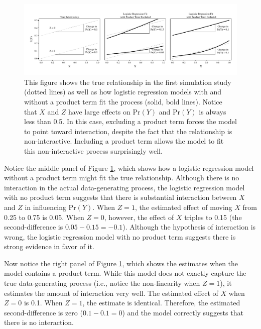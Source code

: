 \documentclass[12pt]{article}
\begin{document}
\begin{figure}[H]
\begin{center}
\includegraphics[width=\linewidth]{fig/fig-example.pdf}
\end{center}
\caption{This figure shows the true relationship in the first simulation study (dotted lines) as well as how logistic regression models with and without a product term fit the process (solid, bold lines). Notice that $X$ and $Z$ have large effects on $\text{Pr}(Y)$ and $\text{Pr}(Y)$ is always less than 0.5. In this case, excluding a product term forces the model to point toward interaction, despite the fact that the relationship is non-interactive. Including a product term allows the model to fit this non-interactive process surprisingly well.}\label{fig:relationships-fits}
\end{figure}

Notice the middle panel of Figure \ref{fig:relationships-fits}, which shows how a logistic regression model without a product term might fit the true relationship. Although there is no interaction in the actual data-generating process, the logistic regression model with no product term suggests that there is  substantial interaction between $X$ and $Z$ in influencing $\text{Pr}(Y)$. When $Z=1$, the estimated effect of moving $X$ from 0.25 to 0.75 is 0.05. When $Z=0$, however, the effect of $X$ triples to 0.15 (the second-difference is $0.05 - 0.15 = -0.1$). Although the hypothesis of interaction is wrong, the logistic regression model with no product term suggests there is strong evidence in favor of it.

Now notice the right panel of Figure \ref{fig:relationships-fits}, which shows the estimates when the model contains a product term. While this model does not exactly capture the true data-generating process (i.e., notice the non-linearity when $Z = 1$), it estimates the amount of interaction very well. The estimated effect of $X$ when $Z=0$  is 0.1. When $Z = 1$, the estimate is identical. Therefore, the estimated second-difference is zero ($0.1 - 0.1 = 0$) and the model correctly suggests that there is no interaction.
\end{document}
